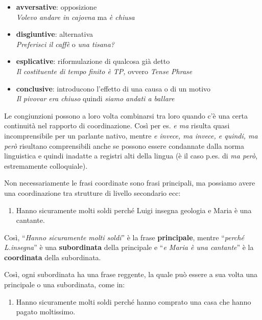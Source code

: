 \documentclass[
  a4paper,
  twoside,
  11pt,
  chapterprefix=false,
  bibliography=totocnumbered,
  listof=flat]{scrbook}
\providecommand{\tightlist}{%
  \setlength{\itemsep}{0pt}\setlength{\parskip}{0pt}}
\begin{document}
\begin{itemize}
\tightlist
\item
  \textbf{avversative}: opposizione\\
  \emph{Volevo andare in cajovna} ma \emph{è chiusa}
\item
  \textbf{disgiuntive}: alternativa\\
  \emph{Preferisci il caffè} o \emph{una tisana?}
\item
  \textbf{esplicative}: riformulazione di qualcosa già detto\\
  \emph{Il costituente di tempo finito è TP,} ovvero \emph{Tense Phrase}
\item
  \textbf{conclusive}: introducono l'effetto di una causa o di un motivo\\
  \emph{Il pivovar era chiuso} quindi \emph{siamo andati a ballare}
\end{itemize}

Le congiunzioni possono a loro volta combinarsi tra loro quando c'è una certa continuità nel rapporto di coordinazione. Così per es. \emph{e ma} risulta quasi incomprensibile per un parlante nativo, mentre \emph{e invece, ma invece, e quindi, ma però} risultano comprensibili anche se possono essere condannate dalla norma linguistica e quindi inadatte a registri alti della lingua (è il caso p.es. di \emph{ma però}, estremamente colloquiale).

Non necessariamente le frasi coordinate sono frasi principali, ma possiamo avere una coordinazione tra strutture di livello secondario ecc:

\begin{enumerate}
\def\labelenumi{(\arabic{enumi})}
\setcounter{enumi}{19}
\tightlist
\item
  Hanno sicuramente molti soldi perché Luigi insegna geologia e Maria è una cantante.
\end{enumerate}

Così, \enquote{\emph{Hanno sicuramente molti soldi}} è la frase \textbf{principale}, mentre \enquote{\emph{perché L.insegna}} è una \textbf{subordinata} della principale e \enquote{\emph{e Maria è una cantante}} è la \textbf{coordinata} della subordinata.

Così, ogni subordinata ha una frase reggente, la quale può essere a sua volta una principale o una subordinata, come in:

\begin{enumerate}
\def\labelenumi{(\arabic{enumi})}
\setcounter{enumi}{20}
\tightlist
\item
  Hanno sicuramente molti soldi perché hanno comprato una casa che hanno pagato moltissimo.
\end{enumerate}
\end{document}
